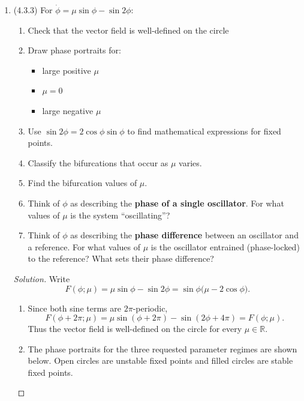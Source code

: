 \documentclass[12pt]{amsart}
\theoremstyle{conjecture}
\theoremstyle{definition}
\theoremstyle{question}
\theoremstyle{theorem}
\newenvironment{solution}
{\begin{proof}[Solution]}
{\end{proof}}
\begin{document}
\begin{enumerate}
        \item (4.3.3) For $\dot\phi=\mu\sin\phi-\sin 2\phi$:
        \begin{enumerate}[label=(\alph*),leftmargin=2.6em,itemsep=0.3em]
          \item Check that the vector field is well-defined on the circle
          \item Draw phase portraits for:
          \begin{itemize}
              \item large positive $\mu$
              \item $\mu=0$
              \item large negative $\mu$
          \end{itemize}
          \item Use $\sin 2\phi=2\cos\phi\sin\phi$ to find mathematical expressions for fixed points.
          \item Classify the bifurcations that occur as $\mu$ varies.
          \item Find the bifurcation values of $\mu$.
          \item Think of $\phi$ as describing the \textbf{phase of a single oscillator}. For what values of
          $\mu$ is the system ``oscillating''?
          \item Think of $\phi$ as describing the \textbf{phase difference} between an oscillator and a
          reference. For what values of $\mu$ is the oscillator entrained (phase-locked) to the reference?
          What sets their phase difference?
        \end{enumerate}

        \begin{solution}
            Write
            \[
                F(\phi;\mu)=\mu\sin\phi-\sin 2\phi
                =\sin\phi\bigl(\mu-2\cos\phi\bigr).
            \]

            \begin{enumerate}[label=(\alph*),leftmargin=2.6em,itemsep=0.55em]
              \item Since both sine terms are $2\pi$-periodic,
              \[
                  F(\phi+2\pi;\mu)
                  =\mu\sin(\phi+2\pi)-\sin(2\phi+4\pi)
                  =F(\phi;\mu).
              \]
              Thus the vector field is well-defined on the circle for every
              $\mu\in\mathbb{R}$.

              \item The phase portraits for the three requested parameter regimes are
              shown below. Open circles are unstable fixed points and filled circles are
              stable fixed points.


\end{enumerate}
\end{solution}
\end{enumerate}
\end{document}
